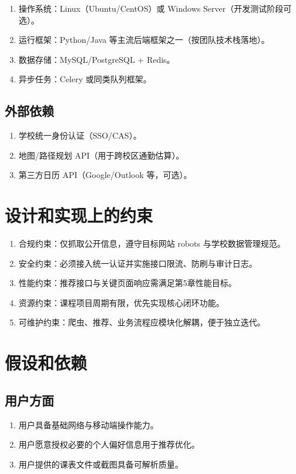 \documentclass[UTF8,a4paper,12pt,fontset=none]{ctexrep}
\begin{document}
\begin{enumerate}[leftmargin=2.5em]
\item 操作系统：Linux（Ubuntu/CentOS）或 Windows Server（开发测试阶段可选）。
\item 运行框架：Python/Java 等主流后端框架之一（按团队技术栈落地）。
\item 数据存储：MySQL/PostgreSQL + Redis。
\item 异步任务：Celery 或同类队列框架。
\end{enumerate}

\subsection{外部依赖}

\begin{enumerate}[leftmargin=2.5em]
\item 学校统一身份认证（SSO/CAS）。
\item 地图/路径规划 API（用于跨校区通勤估算）。
\item 第三方日历 API（Google/Outlook 等，可选）。
\end{enumerate}

\section{设计和实现上的约束}

\begin{enumerate}[leftmargin=2.5em]
\item 合规约束：仅抓取公开信息，遵守目标网站 robots 与学校数据管理规范。
\item 安全约束：必须接入统一认证并实施接口限流、防刷与审计日志。
\item 性能约束：推荐接口与关键页面响应需满足第5章性能目标。
\item 资源约束：课程项目周期有限，优先实现核心闭环功能。
\item 可维护约束：爬虫、推荐、业务流程应模块化解耦，便于独立迭代。
\end{enumerate}

\section{假设和依赖}

\subsection{用户方面}

\begin{enumerate}[leftmargin=2.5em]
\item 用户具备基础网络与移动端操作能力。
\item 用户愿意授权必要的个人偏好信息用于推荐优化。
\item 用户提供的课表文件或截图具备可解析质量。
\end{enumerate}
\end{document}
